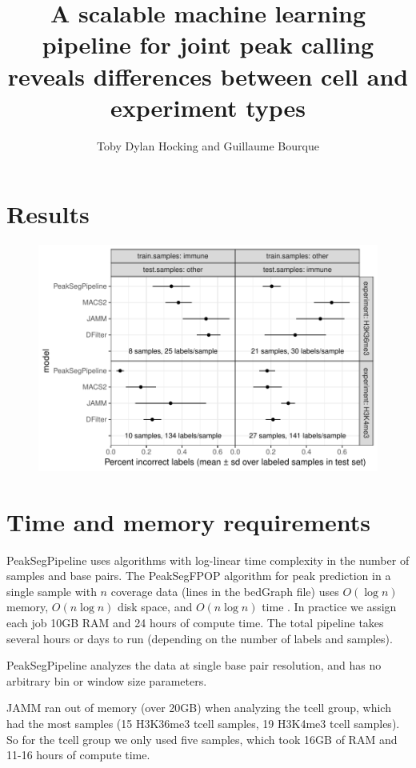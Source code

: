 \documentclass{article}
\begin{document}
\title{A scalable machine learning pipeline for joint peak calling
  reveals differences between cell and experiment types}
\author{Toby Dylan Hocking and Guillaume Bourque}
\maketitle

\section{Results}

\begin{figure}
  \centering
  \includegraphics[width=\textwidth]{figure-test-error}
\end{figure}

\section{Time and memory requirements}

PeakSegPipeline uses algorithms with log-linear time complexity in the
number of samples and base pairs. The PeakSegFPOP algorithm for peak
prediction in a single sample with $n$ coverage data (lines in the
bedGraph file) uses $O(\log n)$ memory, $O(n \log n)$ disk space, and
$O(n\log n)$ time
\citep{Hocking-constrained-changepoint-detection}. In practice we
assign each job 10GB RAM and 24 hours of compute time. The total
pipeline takes several hours or days to run (depending on the number
of labels and samples).

PeakSegPipeline analyzes the data at single base pair resolution, and
has no arbitrary bin or window size parameters.

JAMM ran out of memory (over 20GB) when analyzing the tcell group, which
had the most samples (15 H3K36me3 tcell samples, 19 H3K4me3 tcell
samples). So for the tcell group we only used five samples, which took
16GB of RAM and 11-16 hours of compute time.



\end{document}
